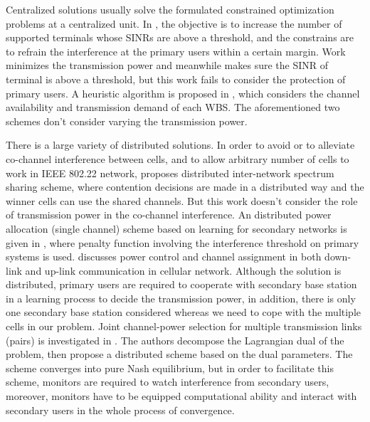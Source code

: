 Centralized solutions usually solve the formulated constrained optimization problems at a centralized unit.
In \cite{downlink-centralized-08-TWC}, the objective is to increase the number of supported terminals whose SINRs are above a threshold, and the constrains are to refrain the interference at the primary users within a certain margin.
Work \cite{joint_power_channel_linkpair_08ICT} minimizes the transmission power and meanwhile makes sure the SINR of terminal is above a threshold, but this work fails to consider the protection of primary users.
A heuristic algorithm is proposed in \cite{centralized_80222_sharing_ifip2011}, which considers the channel availability and transmission demand of each WBS.
The aforementioned two schemes don't consider varying the transmission power.

There is a large variety of distributed solutions.
In order to avoid or to alleviate co-channel interference between cells, and to allow arbitrary number of cells to work in IEEE 802.22 network, \cite{Inter-Network_Spectrum_Sharing_80222_08} proposes distributed inter-network spectrum sharing scheme, where contention decisions are made in a distributed way and the winner cells can use the shared channels.
But this work doesn't consider the role of transmission power in the co-channel interference.
An distributed power allocation (single channel) scheme based on learning for secondary networks is given in \cite{aggregatedInf_Galindo_crowncom09}, where penalty function involving the interference threshold on primary systems is used.
%
\cite{HoangPowerChannel2010} discusses power control and channel assignment in both down-link and up-link communication in cellular network. 
Although the solution is distributed, primary users are required to cooperate with secondary base station in a learning process to decide the transmission power, in addition, there is only one secondary base station considered whereas we need to cope with the multiple cells in our problem.
%
Joint channel-power selection for multiple transmission links (pairs) is investigated in \cite{wuinfocom09}. 
The authors decompose the Lagrangian dual of the problem, then propose a distributed scheme based on the dual parameters. 
The scheme converges into pure Nash equilibrium, but in order to facilitate this scheme, monitors are required to watch interference from secondary users, moreover, monitors have to be equipped computational ability and interact with secondary users in the whole process of convergence.
%

